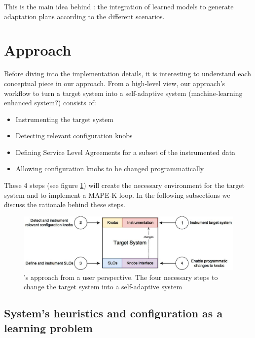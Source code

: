 This is the main idea behind \projectname{}: the integration of learned models to generate adaptation plans according to the different scenarios.

\section{Approach}


Before diving into the implementation details, it is interesting to understand each conceptual piece in our approach. From a high-level view, our approach's workflow to turn a target system into a self-adaptive system (machine-learning enhanced system?) consists of:

\begin{itemize}
  \item Instrumenting the target system
  \item Detecting relevant configuration knobs
  \item Defining Service Level Agreements for a subset of the instrumented data
  \item Allowing configuration knobs to be changed programmatically
\end{itemize}

These 4 steps (see figure \ref{fig:finch1}) will create the necessary environment for the target system and \projectname{} to implement a MAPE-K loop. In the following subsections we discuss the rationale behind these steps. 

\begin{figure}[t]
  \includegraphics[width=\textwidth]{images/finch_user_perspective.jpg}
  \caption{\projectname{}'s approach from a user perspective. The four necessary steps to change the target system into a self-adaptive system}
  \label{fig:finch1}
\end{figure}

\subsection{System's heuristics and configuration as a learning problem}

